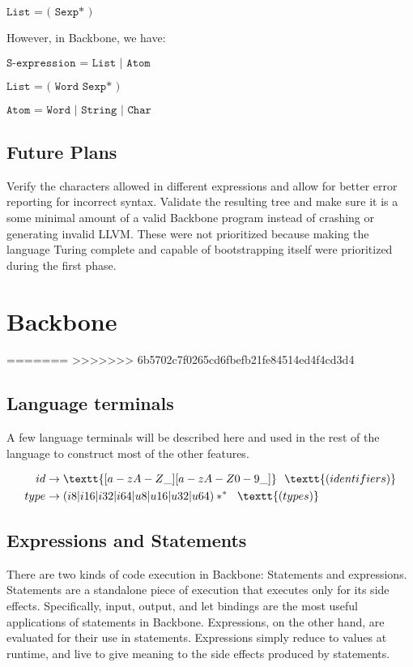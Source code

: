 \documentclass[journal=jacsat, manuscript=article]{achemso}
\begin{document}
$\texttt{List = ( Sexp* )}$

However, in Backbone, we have:

$\texttt{S-expression = List | Atom}$

$\texttt{List = ( Word Sexp* )}$

$\texttt{Atom = Word | String | Char}$

\subsection{Future Plans}

Verify the characters allowed in different expressions and allow for better error reporting for
incorrect syntax. Validate the resulting tree and make sure it is a some minimal amount of
a valid Backbone program instead of crashing or generating invalid LLVM. These were not
prioritized because making the language Turing complete and capable of bootstrapping itself
were prioritized during the first phase.

\section{Backbone}

=======
>>>>>>> 6b5702c7f0265cd6fbefb21fe84514ed4f4cd3d4
\subsection{Language terminals}

A few language terminals will be described here and used in the rest of the
language to construct most of the other features.

\begin{align}
    id &\rightarrow \textt{[a-zA-Z\_][a-zA-Z0-9\_]}\,\,\,\,\textt{(identifiers)}\\
    type &\rightarrow (i8|i16|i32|i64|u8|u16|u32|u64)*^*\,\,\,\,\textt{(types)} \\
\end{align}

\subsection{Expressions and Statements}

There are two kinds of code execution in Backbone: Statements and expressions.
Statements are a standalone piece of execution that executes only for its side effects.
Specifically, input, output, and let bindings are the most useful applications of
statements in Backbone. Expressions, on the other hand, are evaluated for their use in 
statements. Expressions simply reduce to values at runtime, and live to give meaning
to the side effects produced by statements.
\end{document}
